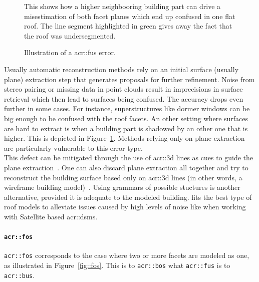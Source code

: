 \begin{figure}[H]
{\begin{subfloatrow}
{{                                        This shows how a higher neighbooring building part can drive a misestimation of both facet planes which end up confused in one flat roof.
                                        The line segment highlighted in green gives away the fact that the roof was undersegmented.
                                    }
                                }
                        \end{subfloatrow}
                    }{
                        \caption{
                            \label{fig::fus}
                            Illustration of a \gls{acr::fus} error.
                        }
                    }
                \end{figure}

                Usually automatic reconstruction methods rely on an initial surface (usually plane) extraction step that generates proposals for further refinement.
                Noise from stereo pairing or missing data in point clouds result in imprecisions in surface retrieval which then lead to surfaces being confused.
                The accuracy drops even further in some cases.
                For instance, superstructures like dormer windows can be big enough to be confused with the roof facets.
                An other setting where surfaces are hard to extract is when a building part is shadowed by an other one that is higher.
                This is depicted in Figure~\ref{fig::fus}.
                Methods relying only on plane extraction~\parencite{durupt2006automatic,taillandier2004automatic,nan2017polyfit} are particularly vulnerable to this error type.\\

                This defect can be mitigated through the use of \gls{acr::3d} lines as cues to guide the plane extraction~\parencite{zebedin2008fusion,sinha2009piecewise}.
                One can also discard plane extraction all together and try to reconstruct the building surface based only on \gls{acr::3d} lines (in other words, a wireframe building model)~\parencite{langlois2019surface,hofer2017efficient}.
                Using grammars of possible stuctures is another alternative, provided it is adequate to the modeled building.
                \textcite{lafarge2008structural} fits the best type of roof models to alleviate issues caused by high levels of noise like when working with Satellite based \glspl{acr::dsm}.

            \paragraph{\texttt{\acrlong*{acr::fos}}}
                \texttt{\gls{acr::fos}} corresponds to the case where two or more facets are modeled as one, as illustrated in Figure~\ref{fig::fos}.
                This is to \texttt{\gls{acr::bos}} what \texttt{\gls{acr::fus}} is to \texttt{\gls{acr::bus}}.\\

